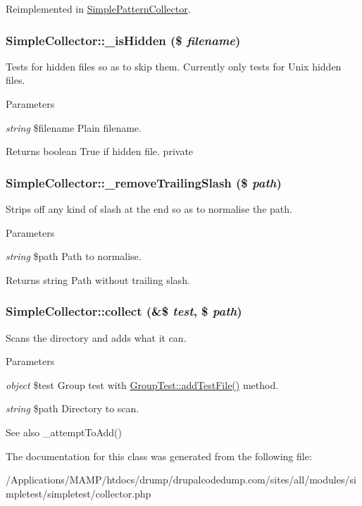 Reimplemented in \hyperlink{class_simple_pattern_collector_a862100ed3f4249ef9360f473aa95e75d}{SimplePatternCollector}.\hypertarget{class_simple_collector_ad7993988a2f4e60d1fa5a89efe38a57b}{
\subsubsection[{\_\-isHidden}]{\setlength{\rightskip}{0pt plus 5cm}SimpleCollector::\_\-isHidden (\$ {\em filename})}}
\label{class_simple_collector_ad7993988a2f4e60d1fa5a89efe38a57b}
Tests for hidden files so as to skip them. Currently only tests for Unix hidden files. 
\begin{DoxyParams}{Parameters}
\item[{\em string}]\$filename Plain filename. \end{DoxyParams}
\begin{DoxyReturn}{Returns}
boolean True if hidden file.  private 
\end{DoxyReturn}
\hypertarget{class_simple_collector_a566985ed6765d322b17541372675ac00}{
\subsubsection[{\_\-removeTrailingSlash}]{\setlength{\rightskip}{0pt plus 5cm}SimpleCollector::\_\-removeTrailingSlash (\$ {\em path})}}
\label{class_simple_collector_a566985ed6765d322b17541372675ac00}
Strips off any kind of slash at the end so as to normalise the path. 
\begin{DoxyParams}{Parameters}
\item[{\em string}]\$path Path to normalise. \end{DoxyParams}
\begin{DoxyReturn}{Returns}
string Path without trailing slash. 
\end{DoxyReturn}
\hypertarget{class_simple_collector_a0dcaa770d0dd18b8be96ecb26170a80d}{
\subsubsection[{collect}]{\setlength{\rightskip}{0pt plus 5cm}SimpleCollector::collect (\&\$ {\em test}, \/  \$ {\em path})}}
\label{class_simple_collector_a0dcaa770d0dd18b8be96ecb26170a80d}
Scans the directory and adds what it can. 
\begin{DoxyParams}{Parameters}
\item[{\em object}]\$test Group test with \hyperlink{}{GroupTest::addTestFile()} method. \item[{\em string}]\$path Directory to scan. \end{DoxyParams}
\begin{DoxySeeAlso}{See also}
\_\-attemptToAdd() 
\end{DoxySeeAlso}


The documentation for this class was generated from the following file:\begin{DoxyCompactItemize}
\item 
/Applications/MAMP/htdocs/drump/drupalcodedump.com/sites/all/modules/simpletest/simpletest/collector.php\end{DoxyCompactItemize}
